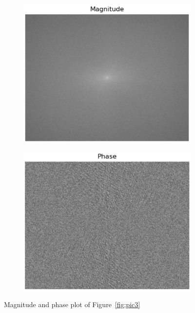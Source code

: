 \documentclass[hidelinks,12pt]{article}
\begin{document}
	\begin{figure}[h!]
		\centering
		\begin{subfigure}[b]{0.45\textwidth}
			\centering
			\includegraphics[width=\textwidth]{figures/pic3_mag.PNG}
		\end{subfigure}
		\hspace{0.5cm}
		\begin{subfigure}[b]{0.45\textwidth}
			\centering
			\includegraphics[width=\textwidth]{figures/pic3_phase.PNG}
		\end{subfigure}
		\caption{Magnitude and phase plot of Figure~\ref{fig:pic3}}
	\end{figure}
	
\end{document}
